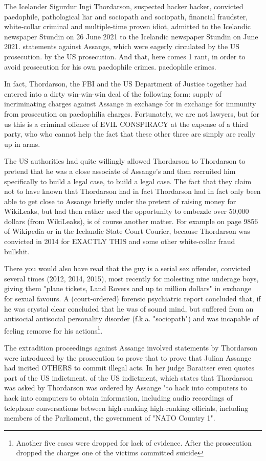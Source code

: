\begin{multicols}{2}
The Icelander Sigurdur Ingi Thordarson, suspected hacker
hacker, convicted paedophile, pathological liar and sociopath
and sociopath, financial fraudster, white-collar criminal
and multiple-time proven idiot, admitted to the Icelandic newspaper Stundin on 26 June 2021
to the Icelandic newspaper Stundin on June 2021.
statements against Assange, which were eagerly circulated by the US prosecution.
by the US prosecution. And that, here comes 1 rant, in order to avoid
prosecution for his own paedophile crimes.
paedophile crimes.

In fact, Thordarson, the FBI and the US Department of Justice together had entered into a dirty win-win-win deal of the following form: supply
of incriminating charges against Assange in exchange for
in exchange for immunity from prosecution on paedophilia charges. Fortunately, we are not lawyers,
but for us this is a criminal offence of EVIL CONSPIRACY at the expense of a third party, who
who cannot help the fact that these other three are simply
are really up in arms.

The US authorities had quite willingly allowed Thordarson to
Thordarson to pretend that he was a close associate of Assange's and then recruited him specifically to build a legal case,
to build a legal case. The fact that they claim not to have known that Thordarson had in fact
Thordarson had in fact only been able to get close to Assange briefly
under the pretext of raising money for WikiLeaks, but had then rather used the opportunity to embezzle over 50,000 dollars (from WikiLeaks), is of course another matter. For example
on page 9856 of Wikipedia or in the Icelandic State Court Courier, because Thordarson was convicted in 2014 for
EXACTLY THIS and some other white-collar fraud bullshit.

There you would also have read that the guy is a serial sex offender, convicted several times (2012, 2014,
2015), most recently for molesting nine underage boys, giving them "plane tickets, Land Rovers and up to
million dollars" in exchange for sexual favours. A (court-ordered) forensic psychiatric report concluded that, if he was crystal clear
concluded that he was of sound mind, but suffered from an antisocial
antisocial personality disorder (f.k.a. "sociopath") and was incapable of feeling remorse for his 
actions\footnote[20]{Another five cases were dropped for lack of evidence. After the prosecution dropped the charges one of the victims committed suicide}.

The extradition proceedings against Assange involved
statements by Thordarson were introduced by the prosecution to prove that
to prove that Julian Assange had incited OTHERS to commit illegal acts. In her
judge Baraitser even quotes part of the US indictment.
of the US indictment, which states that Thordarson was asked by
Thordarson was ordered by Assange "to hack into computers
to hack into computers to obtain information, including audio recordings of telephone conversations between high-ranking
high-ranking officials, including members of the
Parliament, the government of "NATO Country 1".


\end{multicols}
